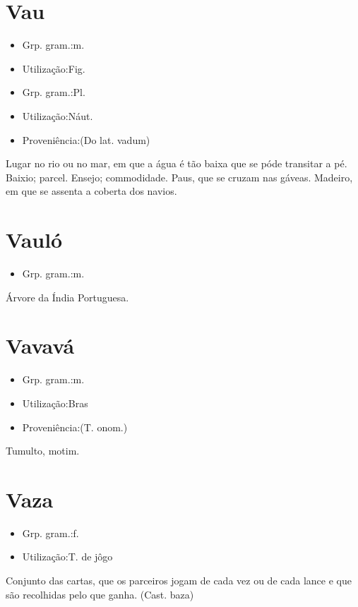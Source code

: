 \documentclass{article}
\begin{document}
\section{Vau}
\begin{itemize}
\item {Grp. gram.:m.}
\end{itemize}
\begin{itemize}
\item {Utilização:Fig.}
\end{itemize}
\begin{itemize}
\item {Grp. gram.:Pl.}
\end{itemize}
\begin{itemize}
\item {Utilização:Náut.}
\end{itemize}
\begin{itemize}
\item {Proveniência:(Do lat. \textunderscore vadum\textunderscore )}
\end{itemize}
Lugar no rio ou no mar, em que a água é tão baixa que se póde transitar a pé.
Baixio; parcel.
Ensejo; commodidade.
Paus, que se cruzam nas gáveas.
Madeiro, em que se assenta a coberta dos navios.
\section{Vauló}
\begin{itemize}
\item {Grp. gram.:m.}
\end{itemize}
Árvore da Índia Portuguesa.
\section{Vavavá}
\begin{itemize}
\item {Grp. gram.:m.}
\end{itemize}
\begin{itemize}
\item {Utilização:Bras}
\end{itemize}
\begin{itemize}
\item {Proveniência:(T. onom.)}
\end{itemize}
Tumulto, motim.
\section{Vaza}
\begin{itemize}
\item {Grp. gram.:f.}
\end{itemize}
\begin{itemize}
\item {Utilização:T. de jôgo}
\end{itemize}
Conjunto das cartas, que os parceiros jogam de cada vez ou de cada lance e que são recolhidas pelo que ganha.
(Cast. \textunderscore baza\textunderscore )
\end{document}
